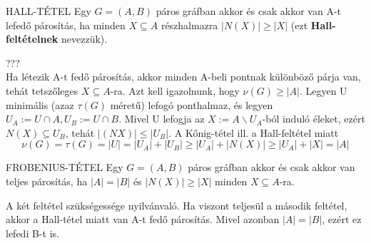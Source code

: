 \begin{tetel}{HALL-TÉTEL}
Egy $G = (A,B)$ páros gráfban akkor és csak akkor van A-t lefedő párosítás, ha minden $X \subseteq A$ részhalmazra $|N(X)| \geq |X|$ (ezt \textbf{Hall-feltételnek} nevezzük).
\end{tetel}

\begin{bizonyitas}{}
??? \\
Ha létezik A-t fedő párosítás, akkor minden A-beli pontnak különböző párja van, tehát tetszőleges $X \subseteq A$-ra. Azt kell igazolnunk, hogy $\nu(G) \geq |A|$. Legyen U minimális (azaz $\tau(G)$ méretű) lefogó ponthalmaz, és legyen $U_A :=U\cap A,U_B:=U\cap B$. Mivel U lefogja az $X := A \backslash U_A$-ból induló éleket, ezért $N(X) \subseteq U_B$, tehát $|(NX)| \leq |U_B|$. A Kőnig-tétel ill. a Hall-feltétel miatt
$$\nu(G) = \tau(G) = |U| = |U_A| + |U_B| \geq |U_A| + |N(X)| \geq |U_A| + |X| = |A|$$
\end{bizonyitas}

\begin{tetel}{FROBENIUS-TÉTEL}
Egy $G = (A,B)$ páros gráfban akkor és csak akkor van teljes párosítás, ha $|A| = |B|$ és $|N(X)| \geq |X|$ minden $X \subseteq A$-ra.
\end{tetel}

\begin{bizonyitas}{}
A két feltétel szükségessége nyilvánvaló. Ha viszont teljesül a második feltétel, akkor a Hall-tétel miatt van A-t fedő párosítás. Mivel azonban $|A| = |B|$, ezért ez lefedi B-t is.
\end{bizonyitas}

